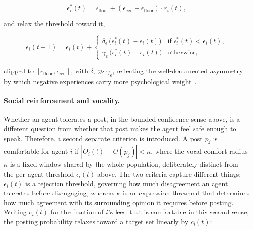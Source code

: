 \documentclass{svproc}
\def\BoundedConfidence{\epsilon} %
\def\VCR{\kappa}                 %
\begin{document}
\begin{equation}
\BoundedConfidence_i^{\ast}(t) = \BoundedConfidence_{\mathrm{floor}} + (\BoundedConfidence_{\mathrm{ceil}}-\BoundedConfidence_{\mathrm{floor}})\cdot r_i(t),
\end{equation}

and relax the threshold toward it,

\begin{equation}
\BoundedConfidence_i(t{+}1) = \BoundedConfidence_i(t) +
\begin{cases}
\delta_{\BoundedConfidence}\,\big(\BoundedConfidence_i^{\ast}(t)-\BoundedConfidence_i(t)\big) & \text{if } \BoundedConfidence_i^{\ast}(t) < \BoundedConfidence_i(t), \\[2pt]
\gamma_{\BoundedConfidence}\,\big(\BoundedConfidence_i^{\ast}(t)-\BoundedConfidence_i(t)\big) & \text{otherwise},
\end{cases}
\label{eq:bc}
\end{equation}

clipped to $[\BoundedConfidence_{\mathrm{floor}},\BoundedConfidence_{\mathrm{ceil}}]$, 
with $\delta_{\BoundedConfidence}\gg\gamma_{\BoundedConfidence}$,
reflecting the well-documented asymmetry by which 
negative experiences carry more psychological weight~\cite{baumeister2001}.

\paragraph{Social reinforcement and vocality.}\label{subsec:social-reinforcement}
Whether an agent tolerates a post, in the 
bounded confidence sense above, is a 
different question from whether that post 
makes the agent feel safe enough to speak. 
Therefore, a second separate criterion is 
introduced. 
A post $p_j$ is comfortable for agent 
$i$ if $|O_i(t)-O(p_j)|<\VCR$, where the vocal 
comfort radius $\VCR$ is a fixed window shared by 
the whole population, deliberately distinct 
from the per-agent 
threshold $\BoundedConfidence_i(t)$ above. 
The two criteria capture different things: 
$\BoundedConfidence_i(t)$ is a rejection threshold, 
governing how much disagreement an agent tolerates 
before disengaging, whereas $\VCR$ is an 
expression threshold that determines 
how much agreement with its surrounding 
opinion it requires before posting.
Writing $c_i(t)$ for the fraction of $i$'s 
feed that is comfortable in this second sense, 
the posting probability relaxes toward a target 
set linearly by $c_i(t)$:
\end{document}

